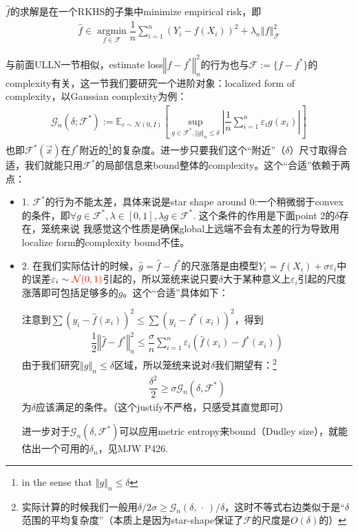 \documentclass[11pt,a4paper]{ctexart}
\numberwithin{equation}{section}%
\begin{document}
$ \hat{f} $的求解是在一个RKHS的子集中minimize empirical risk，即
\begin{align*}
    \hat{f}\in \mathop{ \arg\min  }\limits_{f\in \mathscr{ F }} \dfrac{ 1 }{ n }\sum_{i=1}^n \left( Y_i-f(X_i) \right)^2 + \lambda _n \left\Vert f \right\Vert ^2_{\mathscr{ F }}   
\end{align*}

与前面ULLN一节相似，estimate loss$ \left\Vert f-f^* \right\Vert ^2_n $的行为也与$ \mathscr{F}:=\{f-f^*\} $的complexity有关，这一节我们要研究一个进阶对象：localized form of complexity，以Gaussian complexity为例：
\begin{align*}
    \mathcal{G}_n(\delta ;\mathscr{F}^*):= \mathbb{E}_{\varepsilon \sim \mathcal{N}(0,I)}\left[ \mathop{ \sup  }\limits_{g\in \mathscr{F}^*, \left\Vert g  \right\Vert _n\leq \delta } \left\vert \dfrac{ 1 }{ n  } \sum_{i=1}^n \varepsilon _i g(x_i) \right\vert  \right]  
\end{align*}
也即$ \mathscr{F}^*(\vec{x}) $在$ f^* $附近的\footnote{in the sense that $ \left\Vert g  \right\Vert _n\leq \delta  $}的复杂度。进一步只要我们这个“附近”（$ \delta  $）尺寸取得合适，我们就能只用$ \mathscr{F}^* $的局部信息来bound整体的complexity。这个“合适”依赖于两点：
\begin{itemize}[topsep=2pt,itemsep=0pt]
    \item 1. $ \mathscr{F}^* $的行为不能太差，具体来说是star shape around $ 0 $:一个稍微弱于convex的条件，即$ \forall g\in \mathscr{F}^*, \lambda \in [0,1], \lambda g\in \mathscr{F}^* $. 这个条件的作用是下面point 2的$ \delta  $存在，笼统来说  
    我感觉这个性质是确保global上远端不会有太差的行为导致用localize form的complexity bound不佳。
    \item 2. 在我们实际估计的时候，$ \hat{g}=\hat{f}-f^* $的尺涨落是由模型$ Y_i=f(X_i)+\sigma \varepsilon _i $中的误差$ \varepsilon _i \sim \color{red}\mathcal{N}(0,1)$引起的，所以笼统来说只要$ \delta  $大于某种意义上$ \varepsilon _i $引起的尺度涨落即可包括足够多的$ g $。这个“合适”具体如下：
    
    注意到$ \sum(y_i-\hat{f}(x_i))^2 \leq \sum (y_i-f^*(x_i))^2 $，得到
    \begin{align*}
        \dfrac{ 1 }{ 2 } \left\Vert \hat{f}-f^* \right\Vert _n^2 \leq \dfrac{ \sigma  }{ n  } \sum_{i=1}^n \varepsilon _i(\hat{f}(x_i)-f^*(x_i)) 
    \end{align*}
    由于我们研究$ \left\Vert g  \right\Vert _n\leq \delta   $区域，所以笼统来说对$ \delta  $我们期望有：\footnote{实际计算的时候我们一般用$ \delta /2\sigma  \geq \mathcal{G}_n(\delta ,\, \cdot \, )/\delta  $，这时不等式右边类似于是“$ \delta  $范围的平均复杂度”（本质上是因为star-shape保证了$ \mathscr{F} $的尺度是$ O(\delta ) $的）}
    \begin{align*}
        \dfrac{ \delta ^2 }{ 2 } \geq \sigma \mathcal{G}_n(\delta ,\mathscr{F}^*)
    \end{align*}
    为$ \delta  $应该满足的条件。（这个justify不严格，只感受其直觉即可）
    
    进一步对于$ \mathcal{G}_n(\delta ,\mathscr{F}^*) $可以应用metric entropy来bound（Dudley size），就能估出一个可用的$ \delta _n $，见MJW P426.
\end{itemize}
\end{document}
